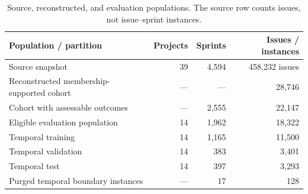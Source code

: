 \begin{table}[htbp]
\centering\footnotesize\setlength{\tabcolsep}{4pt}
\caption{Source, reconstructed, and evaluation populations. The source row counts issues, not issue--sprint instances.}\label{tab:01_cohort}
\begin{tabular}{@{}lrrr@{}}
\toprule
Population / partition & Projects & Sprints & Issues / instances \\
\midrule
Source snapshot & 39 & 4,594 & 458,232 issues \\
Reconstructed membership-supported cohort & --- & --- & 28,746 \\
Cohort with assessable outcomes & --- & 2,555 & 22,147 \\
Eligible evaluation population & 14 & 1,962 & 18,322 \\
Temporal training & 14 & 1,165 & 11,500 \\
Temporal validation & 14 & 383 & 3,401 \\
Temporal test & 14 & 397 & 3,293 \\
Purged temporal boundary instances & --- & 17 & 128 \\
\bottomrule
\end{tabular}
\end{table}
